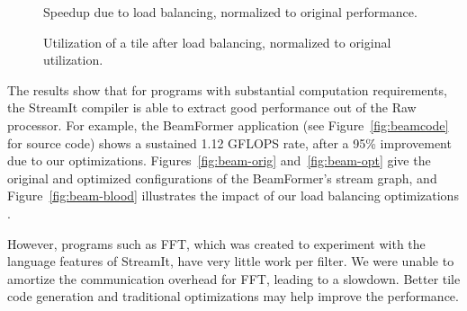 \begin{figure}
\begin{minipage}{3.2in}
\centering
{}
\caption{Speedup due to load balancing, normalized to original performance.
\protect\label{fig:opt-diagram}}
\end{minipage}
\hspace{0.1in}
\begin{minipage}{3.2in}
\centering
{}
\caption{Utilization of a tile after load balancing, normalized to original utilization.\protect\label{fig:utilization-diagram}}
\end{minipage}
\end{figure}

The results show that for programs with substantial computation
requirements, the StreamIt compiler is able to extract good
performance out of the Raw processor.  For example, the BeamFormer
application (see Figure~\ref{fig:beamcode} for source code) shows a
sustained 1.12 GFLOPS rate, after a 95\% improvement due to our
optimizations.  Figures~\ref{fig:beam-orig} and~\ref{fig:beam-opt}
give the original and optimized configurations of the BeamFormer's
stream graph, and Figure~\ref{fig:beam-blood} illustrates the impact
of our load balancing optimizations .

However, programs such as FFT, which was created to experiment with
the language features of StreamIt, have very little work per
filter. We were unable to amortize the communication overhead for FFT,
leading to a slowdown.  Better tile code generation and traditional
optimizations may help improve the performance.

